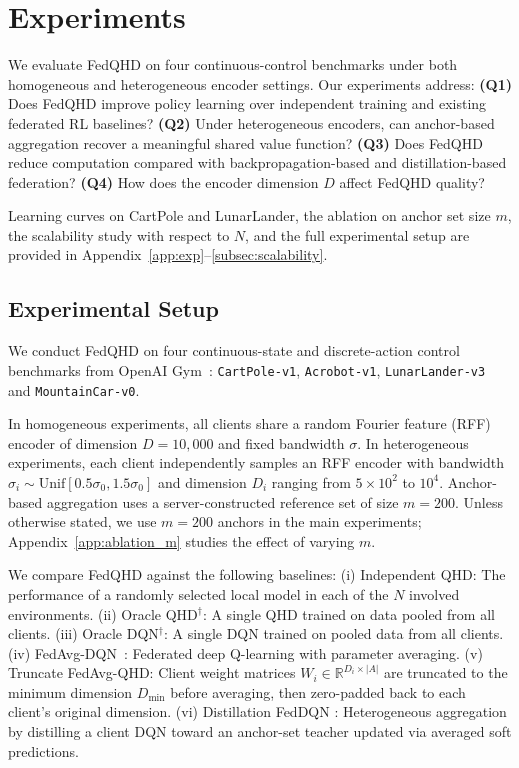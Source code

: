 \documentclass[sigconf,anonymous]{aamas}
\theoremstyle{plain}
\theoremstyle{definition}
\theoremstyle{remark}
\begin{document}

\section{Experiments}
\label{sec:experiments}


We evaluate FedQHD on four continuous-control benchmarks under both
homogeneous and heterogeneous encoder settings. Our experiments address:
\textbf{(Q1)} Does FedQHD improve policy learning over independent
training and existing federated RL baselines?
\textbf{(Q2)} Under heterogeneous encoders, can anchor-based aggregation
recover a meaningful shared value function?
\textbf{(Q3)} Does FedQHD reduce computation compared with
backpropagation-based and distillation-based federation?
\textbf{(Q4)} How does the encoder dimension $D$ affect FedQHD quality?

Learning curves on CartPole and LunarLander, the ablation on anchor set size $m$, the scalability study
with respect to $N$, and the full experimental setup are provided in Appendix~\ref{app:exp}--\ref{subsec:scalability}.


\subsection{Experimental Setup}
\label{subsec:exp_setup}

We conduct FedQHD on four continuous-state and discrete-action control benchmarks from OpenAI Gym~\citep{brockman2016openai}: \texttt{CartPole-v1}, \texttt{Acrobot-v1}, \texttt{LunarLander-v3} and \texttt{MountainCar-v0}.

In homogeneous experiments, all clients share a random Fourier feature (RFF) encoder of dimension $D=10{,}000$ and fixed bandwidth $\sigma$.
In heterogeneous experiments, each client independently samples an RFF encoder with bandwidth $\sigma_i \sim \mathrm{Unif}[0.5\sigma_0,1.5\sigma_0]$ and dimension $D_i$ ranging from $5\times10^2$ to $10^4$. Anchor-based aggregation uses a server-constructed reference set of size $m=200$. Unless otherwise stated, we use \(m=200\) anchors in the main experiments; Appendix~\ref{app:ablation_m} studies the effect of varying \(m\).




We compare FedQHD against the following baselines:
{(i) Independent QHD: The performance of a randomly selected local model in each of the $N$ involved environments.} {(ii) Oracle QHD$^\dagger$: A single QHD trained on data pooled from all clients.} { (iii) Oracle DQN$^\dagger$: A single DQN trained on pooled data from all clients.} {(iv) FedAvg-DQN~\citep{jin2022federated}: Federated deep Q-learning with parameter averaging.} { (v) Truncate FedAvg-QHD: Client weight matrices $W_i \in \mathbb{R}^{D_i \times |A|}$ are truncated to the minimum dimension $D_{\min}$ before averaging, then zero-padded back to each client's original dimension.}
{(vi) Distillation FedDQN \citep{jiang2025fedhpd}: Heterogeneous aggregation by distilling a client DQN toward an anchor-set teacher updated via averaged soft predictions.}
\end{document}
